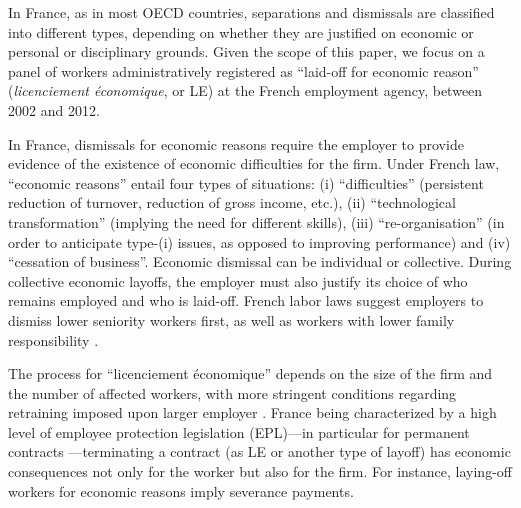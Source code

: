 
\label{appsec:LE_def}

In France, as in most OECD countries, separations and dismissals are classified into different types, depending on whether they are justified on economic or personal or disciplinary grounds. Given the scope of this paper, we focus on a panel of workers administratively registered as ``laid-off for economic reason'' (\textit{licenciement économique}, or LE) at the French employment agency, between 2002 and 2012. 

In France, dismissals for economic reasons require the employer to provide evidence of the existence of economic difficulties for the firm. Under French law, ``economic reasons'' entail four types of situations: (i) ``difficulties'' (persistent reduction of turnover, reduction of gross income, etc.), (ii) ``technological transformation'' (implying the need for different skills), (iii) ``re-organisation'' (in order to anticipate type-(i) issues, as opposed to improving performance) and (iv) ``cessation of business''. Economic dismissal can be individual or collective. During collective economic layoffs, the employer must also justify its choice of who remains employed and who is laid-off. 
French labor laws suggest employers to dismiss lower seniority workers first, as well as workers with lower family responsibility \citep{batut2020termination}. 

The process for ``licenciement économique'' depends on the size of the firm and the number of affected workers, with more stringent conditions regarding retraining imposed upon larger employer \citep{bender_margolis2002}. France being characterized by a high level of employee protection legislation (EPL)---in particular for permanent contracts \citep{oecd2004}---terminating a contract (as LE or another type of layoff) has economic consequences not only for the worker but also for the firm. For instance, laying-off workers for economic reasons imply severance payments.



